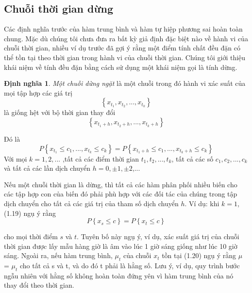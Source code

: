 \documentclass[12pt, a4paper,oneside]{book}
\theoremstyle{definition}
\newtheorem{dn}[theo]{Định nghĩa}
\begin{document}
\subsection{Chuỗi thời gian dừng}
	Các định nghĩa trước của hàm trung bình và hàm tự hiệp phương sai hoàn toàn chung. Mặc dù chúng tôi chưa đưa ra bất kỳ giả định đặc biệt nào về hành vi của chuỗi thời gian, nhiều ví dụ trước đã gợi ý rằng một điểm tính chất đều đặn có thể tồn tại theo thời gian trong hành vi của chuỗi thời gian. Chúng tôi giới thiệu khái niệm về tính đều đặn bằng cách sử dụng một khái niệm gọi là tính dừng. 
\begin{dn}
	\textit{Một chuỗi dừng ngặt} là một chuỗi trong đó hành vi xác suất của mọi tập hợp các giá trị
	$$ \left\lbrace x_{t_{1}}, x_{t_{2}}, ..., x_{t_{k}}\right\rbrace $$
	là giống hệt với bộ thời gian thay đổi
	$$ \left\lbrace x_{t_{1}+h}, x_{t_{2}+h}, ..., x_{t_{k}+h}\right\rbrace  $$
	
	Đó là 
	$$P\left\lbrace x_{t_{1}}\le c_{1},...,x_{t_{k}}\le c_{k}\right\rbrace = P\left\lbrace x_{t_{1}+h}\le c_{1},...,x_{t_{k}+h}\le c_{k}\right\rbrace$$
	Với mọi $k=1,2,...$ ,tất cả các điểm thời gian $t_{1},t_{2},...,t_{k}$, tất cả các số $c_{1},c_{2},...,c_{k}$ và tất cả các lần dịch chuyển $h=0,\pm1,\pm2$,...
	
\end{dn}

Nếu một chuỗi thời gian là dừng, thì tất cả các hàm phân phối nhiều biến cho các tập hợp con của biến đó phải phù hợp với các đối tác của chúng trong tập dịch chuyển cho tất cả các giá trị của tham số dịch chuyển $h$. 
Ví dụ: khi $k = 1$, (1.19) ngụ ý rằng
$$P\left\lbrace x_{s} \le  c \right\rbrace = P\left\lbrace x_{t} \le  c \right\rbrace $$ 

cho mọi thời điểm $s$ và $t$. Tuyên bố này ngụ ý, ví dụ, xác suất giá trị của chuỗi thời gian được lấy mẫu hàng giờ là âm vào lúc 1 giờ sáng giống như lúc 10 giờ sáng. Ngoài ra, nếu hàm trung bình, $\mu_{t}$ của chuỗi $x_{t}$ tồn tại (1.20) ngụ ý rằng $\mu_{}$ = $\mu_{t}$ cho tất cả s và t, và do đó t phải là hằng số. Lưu ý, ví dụ, quy trình bước ngẫu nhiên với hằng số không hoàn toàn đứng yên vì hàm trung bình của nó thay đổi theo thời gian.
\end{document}
